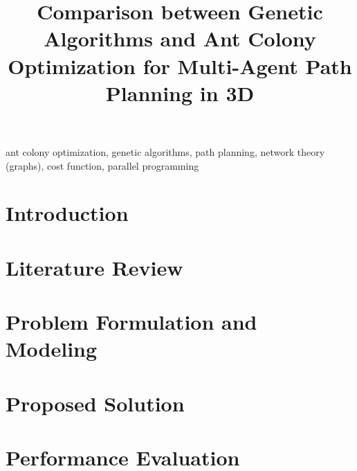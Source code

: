 \documentclass[conference]{IEEEtran}
\begin{document}
\title{Comparison between Genetic Algorithms and Ant Colony Optimization for Multi-Agent Path Planning in 3D}

\author{
\and
{}
\and
{}
\and
{}
\and
{}
\and
{}
}

\maketitle

\begin{abstract}
\blindtext
\end{abstract}

\begin{IEEEkeywords}
ant colony optimization, genetic algorithms, path planning, network theory (graphs), cost function, parallel programming
\end{IEEEkeywords}

\section{Introduction}
\blindtext

\section{Literature Review}
\blindtext

\section{Problem Formulation and Modeling}
\blindtext

\section{Proposed Solution}
\blindtext

\section{Performance Evaluation}
\blindtext
\end{document}
